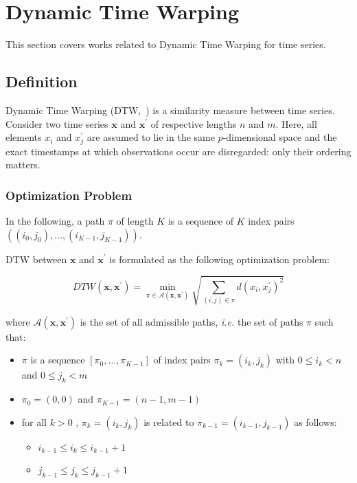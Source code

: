 \section{Dynamic Time Warping}
\label{sec:dtw}

This section covers works related to Dynamic Time Warping for time series.

\subsection{Definition}


Dynamic Time Warping (DTW,~\cite{sakoe1978dynamic}) is a similarity measure
between time series.
Consider two time series $\mathbf{x}$ and
$\mathbf{x}^\prime$ of respective lengths $n$ and
$m$.
Here, all elements $x_i$ and $x^\prime_j$ are assumed to lie in the same
$p$-dimensional space and the exact timestamps at which observations occur are
disregarded: only their ordering matters.

\subsubsection{Optimization Problem}

In the following, a path $\pi$ of length $K$ is a
sequence of $K$ index pairs
$\left((i_0, j_0), \dots , (i_{K-1}, j_{K-1})\right)$.

DTW between $\mathbf{x}$ and $\mathbf{x}^\prime$ is formulated as the following
optimization problem:

\begin{equation}
DTW(\mathbf{x}, \mathbf{x}^\prime) =
    \min_{\pi \in \mathcal{A}(\mathbf{x}, \mathbf{x}^\prime)}
        \sqrt{ \sum_{(i, j) \in \pi} d(x_i, x^\prime_j)^2 }
\label{eq:dtw}
\end{equation}

where $\mathcal{A}(\mathbf{x}, \mathbf{x}^\prime)$ is the set of all admissible
paths, \emph{i.e.} the set of paths $\pi$ such that:

\begin{itemize}
\item $\pi$ is a sequence $[\pi_0, \dots , \pi_{K-1}]$ of index pairs
  $\pi_k = (i_k, j_k)$ with $0 \leq i_k < n$ and $0 \leq j_k < m$
\item $\pi_0 = (0, 0)$ and $\pi_{K-1} = (n - 1, m - 1)$
\item for all $k > 0$ , $\pi_k = (i_k, j_k)$ is related to
  $\pi_{k-1} = (i_{k-1}, j_{k-1})$ as follows:
  \begin{itemize}
  \item $i_{k-1} \leq i_k \leq i_{k-1} + 1$
  \item $j_{k-1} \leq j_k \leq j_{k-1} + 1$
\end{itemize}
\end{itemize}

